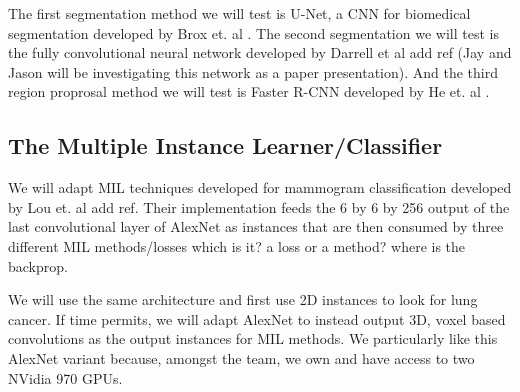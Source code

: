 \documentclass[twocolumn,10pt]{article}
\newcommand{\red}[1]{{\color{red}#1}}
\begin{document}
The first segmentation method we will test is U-Net, a CNN for biomedical
segmentation developed by Brox et. al \cite{U-net_2015}. The second segmentation we 
will test is the fully convolutional neural network developed by Darrell et al 
\red{add ref} (Jay and Jason will be investigating this network as a paper 
presentation). And the third region proprosal method we will test is 
Faster R-CNN developed by He et. al \cite{fast_rcnn_2015, faster_rcnn_2015}.



\subsection{The Multiple Instance Learner/Classifier}

We will adapt MIL techniques developed for mammogram classification developed by
Lou et. al \red{add ref}. Their implementation feeds the 6 by 6 by 256 output of the last
convolutional layer of AlexNet as instances that are then consumed by three
different MIL methods/losses \red{which is it? a loss or a method? where is the backprop}.

We will use the same architecture and first use 2D instances to look for 
lung cancer. If time permits, we will adapt AlexNet to instead output 3D, voxel
based convolutions as the output instances for MIL methods. We particularly like
this AlexNet variant because, amongst the team, we own and have access to two
NVidia 970 GPUs.
\end{document}
